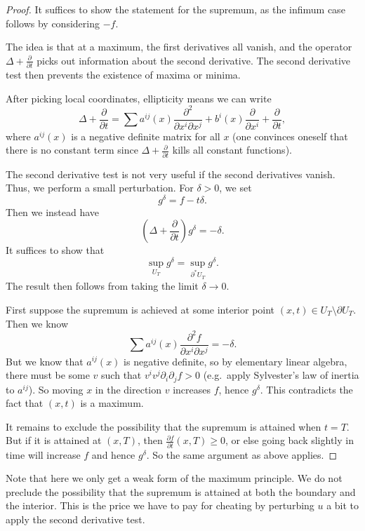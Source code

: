 \documentclass{shortart}
\theoremstyle{definition}
\begin{document}
\begin{proof}
  It suffices to show the statement for the supremum, as the infimum case follows by considering $-f$.

  The idea is that at a maximum, the first derivatives all vanish, and the operator $\Delta + \frac{\partial}{\partial t}$ picks out information about the second derivative. The second derivative test then prevents the existence of maxima or minima.

  After picking local coordinates, ellipticity means we can write
  \[
    \Delta + \frac{\partial}{\partial t} = \sum a^{ij}(x) \frac{\partial^2}{\partial x^i \partial x^j} + b^i (x) \frac{\partial}{\partial x^i} + \frac{\partial}{\partial t},
  \]
  where $a^{ij}(x)$ is a negative definite matrix for all $x$ (one convinces oneself that there is no constant term since $\Delta + \frac{\partial}{\partial t}$ kills all constant functions).

  The second derivative test is not very useful if the second derivatives vanish. Thus, we perform a small perturbation. For $\delta > 0$, we set
  \[
    g^\delta = f - t \delta.
  \]
  Then we instead have
  \[
    \left(\Delta + \frac{\partial}{\partial t}\right)g^\delta = -\delta.
  \]
  It suffices to show that
  \[
    \sup_{U_T} g^\delta = \sup_{\partial^* U_T} g^\delta.
  \]
  The result then follows from taking the limit $\delta \to 0$.

  First suppose the supremum is achieved at some interior point $(x, t) \in U_T \setminus \partial U_T$. Then we know
  \[
    \sum a^{ij}(x) \frac{\partial^2 f}{\partial x^i \partial x^j} = -\delta.
  \]
  But we know that $a^{ij}(x)$ is negative definite, so by elementary linear algebra, there must be some $v$ such that $v^i v^j \partial_i \partial_j f > 0$ (e.g.\ apply Sylvester's law of inertia to $a^{ij}$). So moving $x$ in the direction $v$ increases $f$, hence $g^\delta$. This contradicts the fact that $(x, t)$ is a maximum.

  It remains to exclude the possibility that the supremum is attained when $t = T$. But if it is attained at $(x, T)$, then $\frac{\partial f}{\partial t}(x, T) \geq 0$, or else going back slightly in time will increase $f$ and hence $g^\delta$. So the same argument as above applies.
\end{proof}
Note that here we only get a weak form of the maximum principle. We do not preclude the possibility that the supremum is attained at both the boundary and the interior. This is the price we have to pay for cheating by perturbing $u$ a bit to apply the second derivative test.
\end{document}
